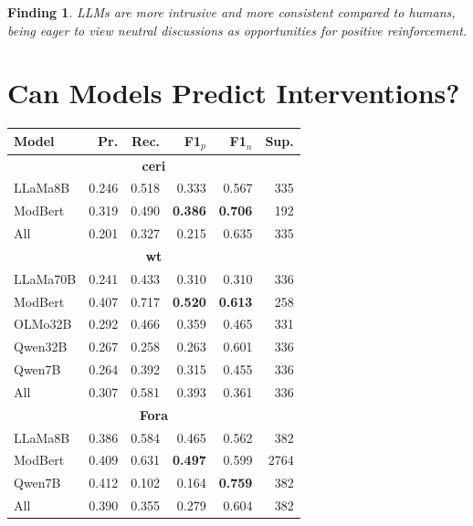 \documentclass[11pt]{article}
\theoremstyle{definition}
\theoremstyle{plain}
\newtheorem{finding}{Finding}
\begin{document}
\begin{finding}
	\label{finding:llm-facilitate-pefk}
	LLMs are more intrusive and more consistent compared to humans, being eager to view neutral discussions as opportunities for positive reinforcement.
\end{finding}


\section{Can Models Predict Interventions?}
\label{sec:facilitator}

\begin{table}[ht]
	\centering
	\small
	\begin{tabular}{lrrrrr}
		\toprule
		Model & Pr. & Rec. & F1$_p$ & F1$_n$ & Sup.\\
		\midrule
		
		\multicolumn{6}{c}{\textbf{\ac{ceri}}} \\
		\midrule
		LLaMa8B  & 0.246 & 0.518 & 0.333 & 0.567 & 335 \\
		ModBert  & 0.319 & 0.490 & \textbf{0.386} & \textbf{0.706} & 192 \\
		{All} & {0.201} & {0.327} & {0.215} & {0.635} & {335} \\
		
		\midrule
		\multicolumn{6}{c}{\textbf{\ac{wt}}} \\
		\midrule
		LLaMa70B & 0.241 & 0.433 & 0.310 & 0.310 & 336 \\
		ModBert  & 0.407 & 0.717 & \textbf{0.520} & \textbf{0.613} & 258 \\
		OLMo32B  & 0.292 & 0.466 & 0.359 & 0.465 & 331 \\
		Qwen32B  & 0.267 & 0.258 & 0.263 & 0.601 & 336 \\
		Qwen7B   & 0.264 & 0.392 & 0.315 & 0.455 & 336 \\
		{All} & {0.307} & {0.581} & {0.393} & {0.361} & {336} \\
		
		\midrule
		\multicolumn{6}{c}{\textbf{Fora}} \\
		\midrule
		LLaMa8B  & 0.386 & 0.584 & 0.465 & 0.562 & 382 \\
		ModBert  & 0.409 & 0.631 & \textbf{0.497} & 0.599 & 2764 \\
		Qwen7B   & 0.412 & 0.102 & 0.164 & \textbf{0.759} & 382 \\
		{All} & {0.390} & {0.355} & {0.279} & {0.604} & {382} \\
		

\end{tabular}
\end{table}
\end{document}
